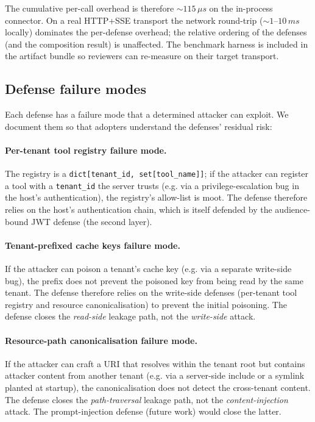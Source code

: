 The cumulative per-call overhead is therefore
$\sim 115\,\mu s$ on the in-process connector. On a real
HTTP+SSE transport the network round-trip ($\sim 1$--$10\,ms$
locally) dominates the per-defense overhead; the relative
ordering of the defenses (and the composition result) is
unaffected. The benchmark harness is included in the
artifact bundle so reviewers can re-measure on their target
transport.

\subsection{Defense failure modes}

Each defense has a failure mode that a determined attacker can
exploit. We document them so that adopters understand the
defenses' residual risk:

\paragraph{Per-tenant tool registry failure mode.} The
registry is a \texttt{dict[tenant\_id, set[tool\_name]]};
if the attacker can register a tool with a \texttt{tenant\_id}
the server trusts (e.g. via a privilege-escalation bug in the
host's authentication), the registry's allow-list is moot.
The defense therefore relies on the host's authentication
chain, which is itself defended by the audience-bound JWT
defense (the second layer).

\paragraph{Tenant-prefixed cache keys failure mode.} If the
attacker can poison a tenant's cache key (e.g. via a separate
write-side bug), the prefix does not prevent the poisoned
key from being read by the same tenant. The defense therefore
relies on the write-side defenses (per-tenant tool registry
and resource canonicalisation) to prevent the initial
poisoning. The defense closes the \emph{read-side} leakage
path, not the \emph{write-side} attack.

\paragraph{Resource-path canonicalisation failure mode.} If
the attacker can craft a URI that resolves within the tenant
root but contains attacker content from another tenant (e.g.
via a server-side include or a symlink planted at startup),
the canonicalisation does not detect the cross-tenant
content. The defense closes the \emph{path-traversal}
leakage path, not the \emph{content-injection} attack. The
prompt-injection defense (future work) would close the
latter.


